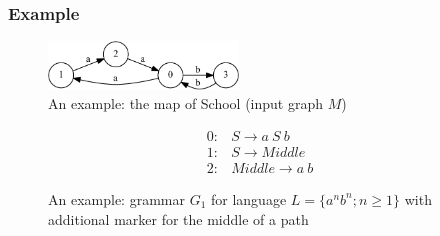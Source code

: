 \documentclass{beamer}
\begin{document}
\begin{frame}
  \transwipe[direction=90]
  \frametitle{Example}
\begin{figure}[ht]
    \centering
        \includegraphics[width=0.45\textwidth]{pictures/input.pdf}
        \caption{An example: the map of School (input graph $M$)}
\end{figure}
\begin{figure}[ht]
\centering
   \[
\begin{array}{rl} 
   0:& S \rightarrow a \ S \ b \\
   1:& S \rightarrow Middle \\
   2:& Middle \rightarrow a \ b
\end{array}
\]
   \caption{An example: grammar $G_1$ for language $L=\{a^n b^n; n \geq 1\}$ with additional marker for the middle of a path}
   \label{grammarG}        
    \end{figure}
\end{frame}
\end{document}
